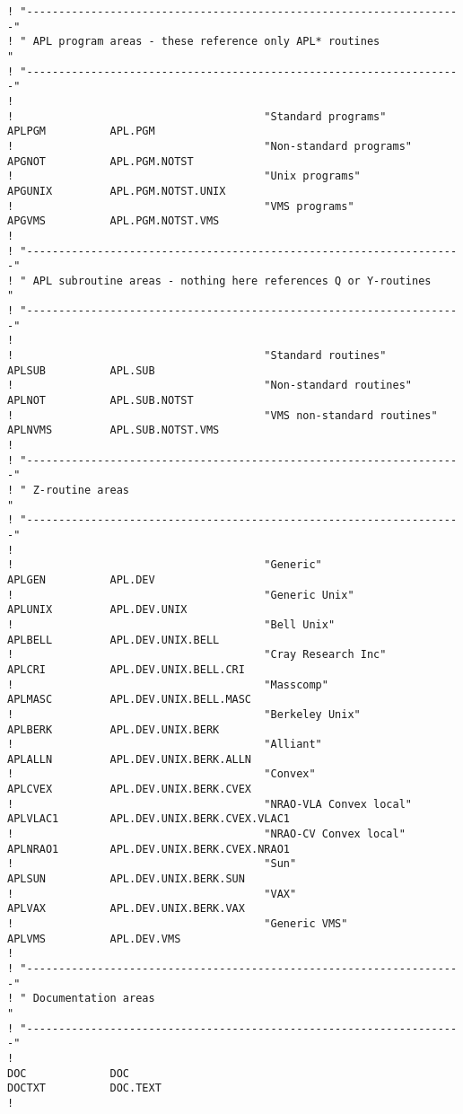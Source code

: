 \begin{verbatim}
! "--------------------------------------------------------------------"
! " APL program areas - these reference only APL* routines             "
! "--------------------------------------------------------------------"
!
!                                       "Standard programs"
APLPGM          APL.PGM
!                                       "Non-standard programs"
APGNOT          APL.PGM.NOTST
!                                       "Unix programs"
APGUNIX         APL.PGM.NOTST.UNIX
!                                       "VMS programs"
APGVMS          APL.PGM.NOTST.VMS
!
! "--------------------------------------------------------------------"
! " APL subroutine areas - nothing here references Q or Y-routines     "
! "--------------------------------------------------------------------"
!
!                                       "Standard routines"
APLSUB          APL.SUB
!                                       "Non-standard routines"
APLNOT          APL.SUB.NOTST
!                                       "VMS non-standard routines"
APLNVMS         APL.SUB.NOTST.VMS
!
! "--------------------------------------------------------------------"
! " Z-routine areas                                                    "
! "--------------------------------------------------------------------"
!
!                                       "Generic"
APLGEN          APL.DEV
!                                       "Generic Unix"
APLUNIX         APL.DEV.UNIX
!                                       "Bell Unix"
APLBELL         APL.DEV.UNIX.BELL
!                                       "Cray Research Inc"
APLCRI          APL.DEV.UNIX.BELL.CRI
!                                       "Masscomp"
APLMASC         APL.DEV.UNIX.BELL.MASC
!                                       "Berkeley Unix"
APLBERK         APL.DEV.UNIX.BERK
!                                       "Alliant"
APLALLN         APL.DEV.UNIX.BERK.ALLN
!                                       "Convex"
APLCVEX         APL.DEV.UNIX.BERK.CVEX
!                                       "NRAO-VLA Convex local"
APLVLAC1        APL.DEV.UNIX.BERK.CVEX.VLAC1
!                                       "NRAO-CV Convex local"
APLNRAO1        APL.DEV.UNIX.BERK.CVEX.NRAO1
!                                       "Sun"
APLSUN          APL.DEV.UNIX.BERK.SUN
!                                       "VAX"
APLVAX          APL.DEV.UNIX.BERK.VAX
!                                       "Generic VMS"
APLVMS          APL.DEV.VMS
!
! "--------------------------------------------------------------------"
! " Documentation areas                                                "
! "--------------------------------------------------------------------"
!
DOC             DOC
DOCTXT          DOC.TEXT
!
\end{verbatim}
